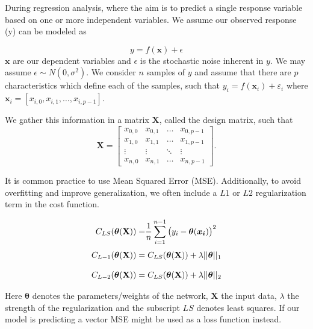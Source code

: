 \documentclass{article}
\theoremstyle{definition}
\begin{document}
During regression analysis, where the aim is to predict a single response variable based on one or more independent variables. We assume our observed response (y) can be modeled as

\begin{equation*}
    y = f(\mathbf{x}) + \epsilon
\end{equation*}
$\mathbf{x}$ are our dependent variables and $\epsilon$ is 
the stochastic noise inherent in $y$. We may assume $\epsilon \sim N(0,\sigma^2)$.
We consider $n$ samples of $y$ and assume that there are $p$ characteristics which define each of the samples, such that $y_i = f(\boldsymbol{x}_i) + \varepsilon_i$ where $\boldsymbol{x}_i = \left[x_{i,0}, x_{i, 1}, \ldots, x_{i, p-1} \right]$.

We gather this information in a matrix $\textbf{X}$, called the design matrix, such that
\begin{equation*}
    \textbf{X} =
    \begin{bmatrix}
        x_{0,0} & x_{0,1} & \ldots & x_{0, p-1} \\
        x_{1,0} & x_{1,1} & \ldots & x_{1, p-1} \\
        \vdots & \vdots & \ddots & \vdots \\
        x_{n,0} & x_{n,1} & \ldots & x_{n, p-1}
    \end{bmatrix}.
\end{equation*}


It is common practice to use Mean Squared Error (MSE). Additionally, to avoid overfitting and improve generalization, we often include a $L1$ or $L2$ regularization term in the cost function. 

\begin{align*}
C_{LS} (\boldsymbol{\theta}(\mathbf{X})) =& \frac{1}{n} \sum_{i=1}^{n-1}\left(y_i - \boldsymbol{\theta}(\boldsymbol{x_i})\right)^2\\[1mm]
C_{L-1} (\boldsymbol{\theta}(\mathbf{X}))= & \hspace{1mm} C_{LS}(\boldsymbol{\theta}(\mathbf{X})) + \lambda ||\boldsymbol{\theta}||_1\\[3mm]
C_{L-2} (\boldsymbol{\theta}(\mathbf{X}))= & \hspace{1mm} C_{LS}(\boldsymbol{\theta}(\mathbf{X})) + \lambda  ||\boldsymbol{\theta}||_2
\end{align*}

Here $\boldsymbol{\theta}$ denotes the parameters/weights of the network,  $\boldsymbol{X}$  the input data,  $\lambda$ the strength of the regularization and the subscript $LS$ denotes least squares. If our model is predicting a vector MSE might be used as a loss function instead.
\end{document}
